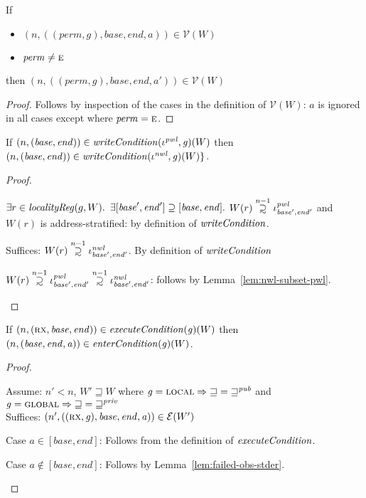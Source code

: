 \documentclass[a4paper]{article}
\newcommand\supsetsim{\mathrel{\ooalign{\raise.2ex\hbox{$\supset$}\cr
      \hidewidth\lower.8ex\hbox{\scalebox{0.9}{$\sim$}}\hidewidth\cr}}}
\newcommand{\nsupsim}[1][n]{\stackrel{\tiny{#1}}{\supsetsim}}
\newcommand{\var}[1]{\mathit{#1}}
\newcommand{\gl}{\var{g}}
\newcommand{\addr}{\var{a}}
\newcommand{\start}{\var{base}}
\newcommand{\addrend}{\var{end}}
\newcommand{\perm}{\var{perm}}
\newcommand{\nwl}{\var{nwl}}
\newcommand{\pwl}{\var{pwl}}
\newcommand{\plainfun}[2]{
  \ifthenelse{\equal{#2}{}}
  {\mathit{#1}}
  {\mathit{#1}(#2)}
}
\newcommand{\writeCond}[1]{\plainfun{writeCondition}{#1}}
\newcommand{\execCond}[1]{\plainfun{executeCondition}{#1}}
\newcommand{\entryCond}[1]{\plainfun{enterCondition}{#1}}
\newcommand{\future}{\mathbin{\sqsupseteq}}
\newcommand{\futurewk}{\mathbin{\sqsupseteq}^{\var{pub}}}
\newcommand{\futurestr}{\mathbin{\sqsupseteq}^{\var{priv}}}
\newcommand{\asmType}{\plaindom{AsmType}}
\newcommand{\plaindom}[1]{\mathrm{#1}}
\newcommand{\intr}[2]{\mathcal{#1}}
\newcommand{\valueintr}[1]{\intr{V}{#1}}
\newcommand{\exprintr}[1]{\intr{E}{#1}}
\newcommand{\stdvr}{\valueintr{\asmType}}
\newcommand{\stder}{\exprintr{\asmType}}
\newcommand{\npair}[2][n]{\left(#1,#2 \right)}
\newcommand{\plainperm}[1]{\textsc{#1}}
\newcommand{\exec}{\plainperm{rx}}
\newcommand{\entry}{\plainperm{e}}
\newcommand{\local}{\plainperm{local}}
\newcommand{\glob}{\plainperm{global}}
\begin{document}
 \begin{lemma}
   \label{lem:conds-lea-suffice}
   If
   \begin{itemize}
   \item $\npair{((\perm,\gl),\start,\addrend,\addr)}\in\stdvr(W)$
   \item $\perm \neq \entry$
   \end{itemize}
 
   then $\npair{((\perm,\gl),\start,\addrend,\addr')} \in \stdvr(W)$
 \end{lemma}
 \begin{proof}
   Follows by inspection of the cases in the definition of $\stdvr(W)$: $a$ is
   ignored in all cases except where $\perm = \entry$.
 \end{proof}
 
 \begin{lemma}
   \label{lem:pwl-writecond-implies-nwl}
   If $\npair{(\start,\addrend)} \in \writeCond{}(\iota^\pwl,\gl)(W)$ then
   $\npair{(\start,\addrend)} \in \writeCond{}(\iota^\nwl,\gl)(W) \}$.
 \end{lemma}
 \begin{proof}
   \begin{enumproof}
   \item $\exists r \in \var{localityReg}(g,W) \ldotp$ $\exists
     [\start',\addrend'] \supseteq [\start,\addrend] \ldotp$ $W(r)\nsupsim[n-1]
     \iota^\pwl_{\start',\addrend'}$ and $W(r)$ is address-stratified: by definition of $\writeCond{}$.
   \item Suffices: $W(r)\nsupsim[n-1] \iota^\nwl_{\start',\addrend'}$. By
     definition of $\writeCond{}$
   \item $W(r)\nsupsim[n-1] \iota^\pwl_{\start',\addrend'} \nsupsim[n-1]
     \iota^\nwl_{\start',\addrend'}$: follows by Lemma~\ref{lem:nwl-subset-pwl}.
   \end{enumproof}
 \end{proof}
 
 \begin{lemma}
   \label{lem:execCond-implies-entryCond}
   If $\npair{(\exec,\start,\addrend)} \in \execCond{}(\gl)(W)$ then
     $\npair{(\start,\addrend,\addr)} \in \entryCond{}(\gl)(W)$.
 \end{lemma}
 \begin{proof}
   \begin{enumproof}
   \item Assume: $n' < n$, $W' \future W$ where $\gl = \local \Rightarrow
     \future = \futurewk$ and $\gl = \glob \Rightarrow \future = \futurestr$
     \\
     Suffices: $\npair[n']{((\exec,\gl),\start,\addrend,\addr)} \in \stder(W')$
   \item Case $\addr \in [\start,\addrend]$: Follows from the definition of
     $\execCond{}$.
   \item Case $\addr \not\in[\start,\addrend]$: Follows by
     Lemma~\ref{lem:failed-obs-stder}.
   \end{enumproof}
 \end{proof}
 
\end{document}
